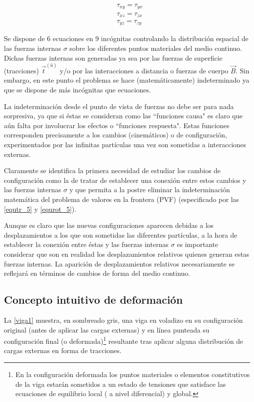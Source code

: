 \documentclass[../notas medios.tex]{subfiles}
\begin{document}
\begin{equation} \label{equrot_5}
\begin{split}
& \tau_{xy} = \tau_{yx} \\
& \tau_{xz} = \tau_{zx} \\
& \tau_{yz} = \tau_{zy}
\end{split}
\end{equation}

Se dispone de 6 ecuaciones en 9 incógnitas controlando la distribución espacial de las fuerzas internas $\sigma$ sobre los diferentes puntos materiales del medio continuo.  Dichas fuerzas internas son generadas ya sea por las fuerzas de superficie (tracciones) ${{\vec t}^{(\hat n)}}$  y/o por las interacciones a distancia o fuerzas de cuerpo ${\vec B}$.  Sin embargo, en este punto el problema se hace (matemáticamente) indeterminado ya que se dispone de más incógnitas que ecuaciones.

La indeterminación desde el punto de vista de fuerzas no debe ser para nada sorpresiva, ya que si éstas se consideran como las ``funciones causa" es claro que aún falta por involucrar los efectos o ``funciones respuesta". Estas funciones corresponden precisamente a los cambios (cinemáticos) o de configuración, experimentados por las infinitas partículas una vez son sometidas a interacciones externas.

Claramente se identifica la primera necesidad de estudiar los cambios de configuración como la de tratar de establecer una conexión entre estos cambios y las fuerzas internas $\sigma$ y que permita a la postre eliminar la indeterminación matemática del problema de valores en la frontera (PVF) (especificado por las \cref{equtr_5} y \cref{equrot_5}).

Aunque es claro que las nuevas configuraciones aparecen debidas a los desplazamientos a los que son sometidas las diferentes partículas, a la hora de establecer la conexión entre éstas y las fuerzas internas $\sigma$ es importante considerar que son en realidad los desplazamientos relativos  quienes generan estas fuerzas internas.  La aparición de desplazamientos relativos necesariamente se reflejará en términos de cambios de forma  del medio continuo.

\subsection{Concepto intuitivo de deformación}
La \cref{viga1} muestra, en sombreado gris, una viga en voladizo en su configuración original (antes de aplicar las cargas externas) y en línea punteada su configuración final (o deformada)\footnote{En la configuración deformada los puntos materiales o elementos constitutivos de la viga estarán sometidos a un estado de tensiones que satisface las ecuaciones de equilibrio local ( a nivel diferencial) y global.} resultante tras aplicar alguna distribución de cargas externas en forma de tracciones.
\end{document}
